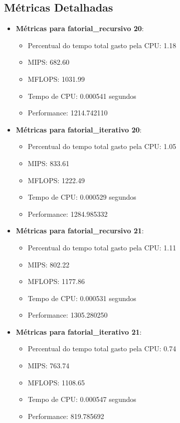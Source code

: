 \documentclass[12pt]{article}
\begin{document}
\subsection{Métricas Detalhadas}

\begin{itemize}
    \item \textbf{Métricas para fatorial\_recursivo 20}:
    \begin{itemize}
        \item Percentual do tempo total gasto pela CPU: 1.18
        \item MIPS: 682.60
        \item MFLOPS: 1031.99
        \item Tempo de CPU: 0.000541 segundos
        \item Performance: 1214.742110
    \end{itemize}

    \item \textbf{Métricas para fatorial\_iterativo 20}:
    \begin{itemize}
        \item Percentual do tempo total gasto pela CPU: 1.05
        \item MIPS: 833.61
        \item MFLOPS: 1222.49
        \item Tempo de CPU: 0.000529 segundos
        \item Performance: 1284.985332
    \end{itemize}

    \item \textbf{Métricas para fatorial\_recursivo 21}:
    \begin{itemize}
        \item Percentual do tempo total gasto pela CPU: 1.11
        \item MIPS: 802.22
        \item MFLOPS: 1177.86
        \item Tempo de CPU: 0.000531 segundos
        \item Performance: 1305.280250
    \end{itemize}

    \item \textbf{Métricas para fatorial\_iterativo 21}:
    \begin{itemize}
        \item Percentual do tempo total gasto pela CPU: 0.74
        \item MIPS: 763.74
        \item MFLOPS: 1108.65
        \item Tempo de CPU: 0.000547 segundos
        \item Performance: 819.785692
    \end{itemize}


\end{itemize}
\end{document}
